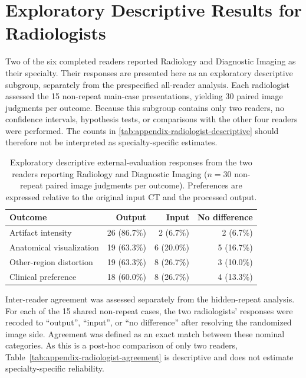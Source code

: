 \clearpage
\section{Exploratory Descriptive Results for Radiologists}
\label{sec:appendix-radiologist-descriptive}

Two of the six completed readers reported Radiology and Diagnostic Imaging as their specialty. Their responses are presented here as an exploratory descriptive subgroup, separately from the prespecified all-reader analysis. Each radiologist assessed the 15 non-repeat main-case presentations, yielding 30 paired image judgments per outcome. Because this subgroup contains only two readers, no confidence intervals, hypothesis tests, or comparisons with the other four readers were performed. The counts in \autoref{tab:appendix-radiologist-descriptive} should therefore not be interpreted as specialty-specific estimates.

\begin{table}[htbp]
    \centering
    \small
    \caption[Descriptive external-evaluation responses from radiologists]{Exploratory descriptive external-evaluation responses from the two readers reporting Radiology and Diagnostic Imaging ($n=30$ non-repeat paired image judgments per outcome). Preferences are expressed relative to the original input CT and the processed output.}
    \label{tab:appendix-radiologist-descriptive}
    \begin{tabular}{lrrr}
        \toprule
        Outcome & Output & Input & No difference \\
        \midrule
        Artifact intensity & 26 (86.7\%) & 2 (6.7\%) & 2 (6.7\%) \\
        Anatomical visualization & 19 (63.3\%) & 6 (20.0\%) & 5 (16.7\%) \\
        Other-region distortion & 19 (63.3\%) & 8 (26.7\%) & 3 (10.0\%) \\
        Clinical preference & 18 (60.0\%) & 8 (26.7\%) & 4 (13.3\%) \\
        \bottomrule
    \end{tabular}
\end{table}

Inter-reader agreement was assessed separately from the hidden-repeat analysis. For each of the 15 shared non-repeat cases, the two radiologists' responses were recoded to ``output'', ``input'', or ``no difference'' after resolving the randomized image side. Agreement was defined as an exact match between these nominal categories. As this is a post-hoc comparison of only two readers, Table~\ref{tab:appendix-radiologist-agreement} is descriptive and does not estimate specialty-specific reliability.

